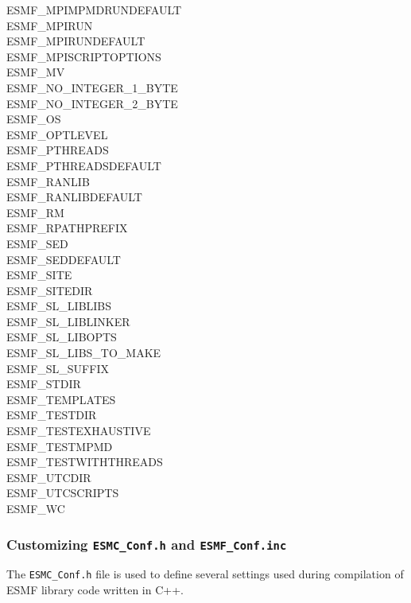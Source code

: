 \begin{description}
\item[ESMF\_MPIMPMDRUNDEFAULT]
\item[ESMF\_MPIRUN]
\item[ESMF\_MPIRUNDEFAULT]
\item[ESMF\_MPISCRIPTOPTIONS]
\item[ESMF\_MV]
\item[ESMF\_NO\_INTEGER\_1\_BYTE]
\item[ESMF\_NO\_INTEGER\_2\_BYTE]
\item[ESMF\_OS]
\item[ESMF\_OPTLEVEL]
\item[ESMF\_PTHREADS]
\item[ESMF\_PTHREADSDEFAULT]
\item[ESMF\_RANLIB]
\item[ESMF\_RANLIBDEFAULT]
\item[ESMF\_RM]
\item[ESMF\_RPATHPREFIX]
\item[ESMF\_SED]
\item[ESMF\_SEDDEFAULT]
\item[ESMF\_SITE]
\item[ESMF\_SITEDIR]
\item[ESMF\_SL\_LIBLIBS]
\item[ESMF\_SL\_LIBLINKER]
\item[ESMF\_SL\_LIBOPTS]
\item[ESMF\_SL\_LIBS\_TO\_MAKE]
\item[ESMF\_SL\_SUFFIX]
\item[ESMF\_STDIR]
\item[ESMF\_TEMPLATES]
\item[ESMF\_TESTDIR]
\item[ESMF\_TESTEXHAUSTIVE]
\item[ESMF\_TESTMPMD]
\item[ESMF\_TESTWITHTHREADS]
\item[ESMF\_UTCDIR]
\item[ESMF\_UTCSCRIPTS]
\item[ESMF\_WC]

\end{description}



\subsubsection{Customizing {\tt ESMC\_Conf.h} and {\tt ESMF\_Conf.inc}}

The {\tt ESMC\_Conf.h} file is used to define several settings used
during compilation of ESMF library code written in C++.

